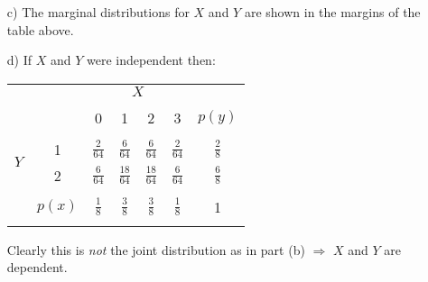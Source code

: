 \documentclass[12pt]{article}
\begin{document}
{\begin{minipage}[t]{0.98\textwidth}
\begin{minipage}[t]{0.47\textwidth}
\begin{enumerate}[a)]
\begin{center}
\begin{tabular}{c|c|cccc|c|}
\cline{2-7}
\multicolumn{7}{c}{}
\end{tabular}
\end{center}
\item[c)] The marginal distributions for $X$ and $Y$ are shown in the margins of the table above.
\end{enumerate}
\end{minipage}\hspace{0.055\textwidth}
\begin{minipage}[t]{0.47\textwidth}
\begin{enumerate}[a)]
\item[d)] If $X$ and $Y$ were independent then:
\begin{center}
\begin{tabular}{c|c|cccc|c|}
\multicolumn{2}{c}{} & \multicolumn{4}{c}{$X$} & \multicolumn{1}{c}{}\\
\cline{2-7}
&&&&&&\\[-0.4cm]
&&                          0 & 1 & 2 & 3 & $p(y)$\\
\cline{2-7}
&&&&&&\\[-0.3cm]
\multirow{2}{*}{$Y$} & 1 & $\frac{2}{64}$ &  $\frac{6}{64}$ & $\frac{6}{64}$ & $\frac{2}{64}$ & $\frac{2}{8}$ \\[0.1cm]
                     & 2 &  $\frac{6}{64}$ &  $\frac{18}{64}$   & $\frac{18}{64}$  & $\frac{6}{64}$  & $\frac{6}{8}$ \\[0.1cm]
\cline{2-7}
&&&&&&\\[-0.3cm]
& $p(x)$ & $\frac{1}{8}$ & $\frac{3}{8}$ & $\frac{3}{8}$ & $\frac{1}{8}$ & 1 \\[0.1cm]
\cline{2-7}
\multicolumn{7}{c}{}
\end{tabular}
\end{center}
Clearly this is \emph{not} the joint distribution as in part (b) $\Rightarrow$ $X$ and $Y$ are dependent.
\end{enumerate}
\end{minipage}
\end{minipage}}\vspace{0.03\textwidth}
\end{document}
